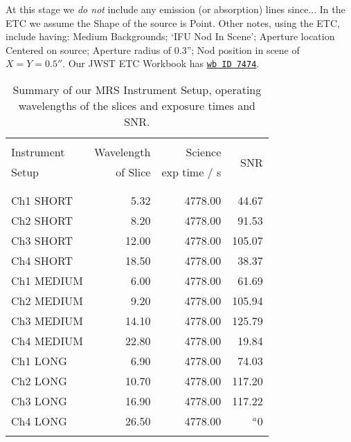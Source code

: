 \smallskip \smallskip 
\noindent
At this stage we {\it do not} include any emission (or absorption)
lines since...  In the ETC we assume the Shape of the source is Point.
Other notes, using the ETC, include having: Medium Backgrounds; `IFU
Nod In Scene'; Aperture location Centered on source; Aperture radius
of 0.3''; Nod position in scene of $X=Y=0.5''$.  Our JWST ETC Workbook
has \href{https://jwst.etc.stsci.edu/workbook.html?wb_id=7474}{{\tt wb
ID 7474}}.


\begin{table}
\begin{center}
\begin{tabular}{|| l | r | r | r ||}
  \hline\hline
  &&& \\
  Instrument 	& 	Wavelength  & Science          & \multirow{ 2}{*}{SNR} \\
  Setup	        &    	       of Slice  & exp time / s  &        \\
  &&& \\
  \hline
  &&& \\
 Ch1 SHORT & 5.32  &  4778.00 & 44.67 \\
 Ch2 SHORT & 8.20  &  4778.00 & 91.53 \\
 Ch3 SHORT & 12.00  &  4778.00 & 105.07 \\
 Ch4 SHORT & 18.50 &  4778.00 & 38.37 \\
 Ch1 MEDIUM & 6.00  &  4778.00 & 61.69 \\
 Ch2 MEDIUM & 9.20  &  4778.00 & 105.94 \\
 Ch3 MEDIUM & 14.10  &  4778.00 & 125.79 \\
 Ch4 MEDIUM & 22.80  &  4778.00 & 19.84 \\
 Ch1 LONG & 6.90  &  4778.00 & 74.03 \\
 Ch2 LONG & 10.70  &  4778.00 & 117.20 \\
 Ch3 LONG & 16.90  &  4778.00 & 117.22 \\
 Ch4 LONG & 26.50  &  4778.00 & $^{a}$0 \\
  &&& \\
  \hline\hline
\end{tabular}
\caption{Summary of our MRS Instrument Setup, 
  operating wavelengths of the slices and exposure 
  times and SNR. 
}
\label{tab:ETC_calcs} 
\end{center}
\end{table}

